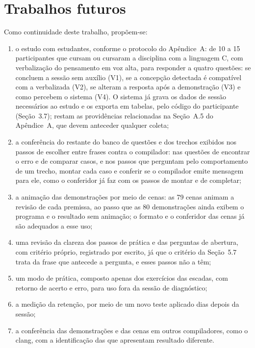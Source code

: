 \section{Trabalhos futuros}

Como continuidade deste trabalho, propõem-se:

\begin{enumerate}
\item o estudo com estudantes, conforme o protocolo do Apêndice~A: de 10 a 15 participantes que cursam ou cursaram a disciplina com a linguagem C, com verbalização do pensamento em voz alta, para responder a quatro questões: se concluem a sessão sem auxílio (V1), se a concepção detectada é compatível com a verbalizada (V2), se alteram a resposta após a demonstração (V3) e como percebem o sistema (V4). O sistema já grava os dados de sessão necessários ao estudo e os exporta em tabelas, pelo código do participante (Seção~3.7); restam as providências relacionadas na Seção~A.5 do Apêndice~A, que devem anteceder qualquer coleta;
\item a conferência do restante do banco de questões e dos trechos exibidos nos passos de escolher entre frases contra o compilador: nas questões de encontrar o erro e de comparar casos, e nos passos que perguntam pelo comportamento de um trecho, montar cada caso e conferir se o compilador emite mensagem para ele, como o conferidor já faz com os passos de montar e de completar;
\item a animação das demonstrações por meio de cenas: as 79 cenas animam a revisão de cada premissa, ao passo que as 80 demonstrações ainda exibem o programa e o resultado sem animação; o formato e o conferidor das cenas já são adequados a esse uso;
\item uma revisão da clareza dos passos de prática e das perguntas de abertura, com critério próprio, registrado por escrito, já que o critério da Seção~5.7 trata da frase que antecede a pergunta, e esses passos não a têm;
\item um modo de prática, composto apenas dos exercícios das escadas, com retorno de acerto e erro, para uso fora da sessão de diagnóstico;
\item a medição da retenção, por meio de um novo teste aplicado dias depois da sessão;
\item a conferência das demonstrações e das cenas em outros compiladores, como o clang, com a identificação das que apresentam resultado diferente.
\end{enumerate}
